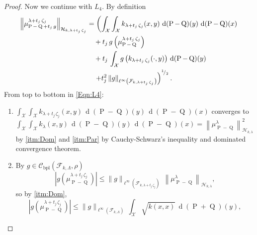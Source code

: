 \begin{proof}
			Now we continue with $L_{4}$. By definition
			\begin{equation}\label{Eqn:L4}
				\begin{aligned}
					\left\|\mu_{\operatorname{P}-\operatorname{Q}+t_{j}\,g}^{\lambda+t_{j}\,\zeta_{j}}\right\|_{\mathcal{H}_{k,\lambda+t_{j}\,\zeta_{j}}}&=\left(\int_{\mathcal{X}}\int_{\mathcal{X}}k_{\lambda+t_{j}\,\zeta_{j}}(x,y)\,\operatorname{d}(\operatorname{P}-\operatorname{Q})(y)\,\operatorname{d}(\operatorname{P}-\operatorname{Q})(x)\right.
					\\
					&\quad+t_{j}\,g\left(\mu_{\operatorname{P}-\operatorname{Q}}^{\lambda+t_{j}\,\zeta_{j}}\right)
					\\
					&\quad+t_{j}\,\int_{\mathcal{X}}g\left(k_{\lambda+t_{j}\,\zeta_{j}}(\cdot,y)\right)\,\operatorname{d}(\operatorname{P}-\operatorname{Q})(y)
					\\
					&\quad\left.+t_{j}^{2}\,\|g\|_{\ell^{\infty}\left(\mathcal{F}_{k,\lambda+t_{j}\,\zeta_{j}}\right)}\right)^{^{1}\!/_{2}}.
				\end{aligned}
			\end{equation}
			From top to bottom in \eqref{Eqn:L4}:
			\begin{enumerate}
				\item $\displaystyle\int_{\mathcal{X}}\int_{\mathcal{X}}k_{\lambda+t_{j}\,\zeta_{j}}(x,y)\,\operatorname{d}(\operatorname{P}-\operatorname{Q})(y)\,\operatorname{d}(\operatorname{P}-\operatorname{Q})(x)$ converges to\break$\displaystyle\int_{\mathcal{X}}\int_{\mathcal{X}}k_{\lambda}(x,y)\,\operatorname{d}(\operatorname{P}-\operatorname{Q})(y)\,\operatorname{d}(\operatorname{P}-\operatorname{Q})(x)=\left\|\mu_{\operatorname{P}-\operatorname{Q}}^{\lambda}\right\|_{\mathcal{H}_{k,\lambda}}^{2}$ by \ref{itm:Dom} and \ref{itm:Par} by Cauchy-Schwarz's inequality and dominated convergence theorem.
				\item By $g\in\mathcal{C}_{\operatorname{bpl}}\left(\mathcal{F}_{k,\Lambda},\rho\right)$
				\begin{equation}
					\left|g\left(\mu_{\operatorname{P}-\operatorname{Q}}^{\lambda+t_{j}\,\zeta_{j}}\right)\right|\leq\|g\|_{\ell^{\infty}\left(\mathcal{F}_{k,\lambda+t_{j}\,\zeta_{j}}\right)}\,\left\|\mu_{\operatorname{P}-\operatorname{Q}}^{\lambda}\right\|_{\mathcal{H}_{k,\lambda}},
				\end{equation}
				so by \ref{itm:Dom},
				\begin{equation}
					\left|g\left(\mu_{\operatorname{P}-\operatorname{Q}}^{\lambda+t_{j}\,\zeta_{j}}\right)\right|\leq\|g\|_{\ell^{\infty}\left(\mathcal{F}_{k,\Lambda}\right)}\,\int_{\mathcal{X}}\sqrt{k(x,x)}\,\operatorname{d}(\operatorname{P}+\operatorname{Q})(y),

\end{equation}
\end{enumerate}
\end{proof}
